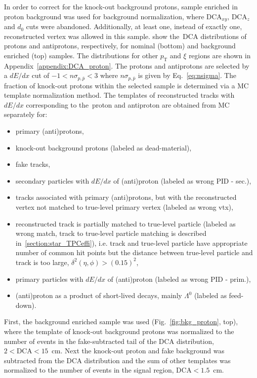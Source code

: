 In order to correct for the knock-out background protons, sample enriched in proton background  was used for background normalization, where $\textrm{DCA}_{xy}$, $\textrm{DCA}_z$ and $d_0$ cuts were abandoned. Additionally, at least one, instead of exactly one,  reconstructed vertex was allowed in this sample.   show the~$\textrm{DCA}$ distributions of protons and antiprotons, respectively, for  nominal (bottom) and background enriched (top) samples. The distributions for other $p_\textrm{T}$ and $\xi$ regions are shown in Appendix~\ref{appendix:DCA_proton}.
The protons and antiprotons are selected by a $dE/dx$ cut of $-1 < n\sigma_{p,\bar{p}} < 3$ where $n\sigma_{p,\bar{p}}$ is given by Eq.~\eqref{eq:nsigma}. The fraction of knock-out protons within the selected sample is determined via a MC template normalization method. The templates of reconstructed tracks with $dE/dx$ corresponding to the~proton and antiproton are obtained from MC separately for:
\begin{itemize}
	\item primary (anti)protons,
	\item knock-out background protons (labeled as dead-material),
	\item fake tracks,
	\item secondary particles with $dE/dx$ of (anti)proton (labeled as wrong PID - sec.),
	\item tracks associated with primary (anti)protons, but with the reconstructed vertex  not matched to true-level primary vertex (labeled as wrong vtx),
	\item reconstructed track is partially matched to true-level particle (labeled as wrong match, track to true-level particle matching is described in~\ref{section:star_TPCeffi}), i.e.  track and true-level particle have appropriate number of common hit points but the distance between true-level particle and track is too large, $\delta^2\left(\eta,\phi\right)>\left(0.15\right)^2$, 
	\item primary particles with $dE/dx$ of (anti)proton (labeled as wrong PID - prim.),
	\item (anti)proton as a product of short-lived decays, mainly $\Lambda^0$ (labeled as feed-down).
\end{itemize}



First, the background enriched sample was used  (Fig.~\ref{fig:bkg_proton}, top), where the template of knock-out background protons was normalized to the number of events in the fake-subtracted tail of the $\textrm{DCA}$ distribution, $2<\textrm{DCA}<15$~cm. Next the knock-out proton and fake background was subtracted from the $\textrm{DCA}$ distribution and the sum of other templates was normalized to the number of events in the signal region,  $\textrm{DCA}<1.5$~cm. 

